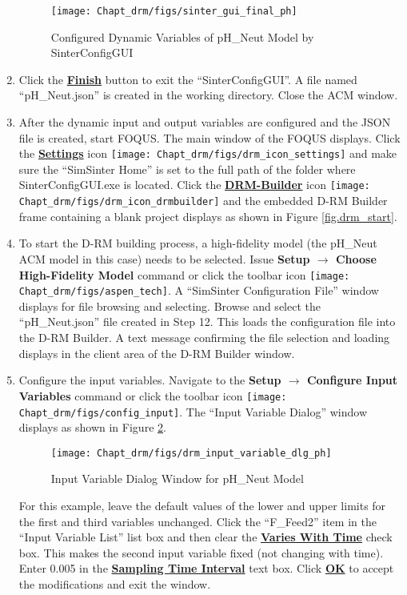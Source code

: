 \begin{enumerate}
\begin{figure}[H]
		\begin{center}
			\texttt{[image: Chapt\_drm/figs/sinter\_gui\_final\_ph]}
			\caption{Configured Dynamic Variables of pH\_Neut Model by SinterConfigGUI}
			\label{fig.sinter_gui_final_ph}
		\end{center}
	\end{figure}
	\item Click the \textbf{\underline{Finish}} button to exit the ``SinterConfigGUI''.  A file named ``pH\_Neut.json'' is created in the working directory.  Close the ACM window.
	\item After the dynamic input and output variables are configured and the JSON file is created, start FOQUS.  The main window of the FOQUS displays.  Click the \textbf{\underline{Settings}} icon \texttt{[image: Chapt\_drm/figs/drm\_icon\_settings]} and make sure the ``SimSinter Home'' is set to the full path of the folder where SinterConfigGUI.exe is located.  Click the \textbf{\underline{DRM-Builder}} icon \texttt{[image: Chapt\_drm/figs/drm\_icon\_drmbuilder]} and the embedded D-RM Builder frame containing a blank project displays as shown in Figure \ref{fig.drm_start}.  
	\item To start the D-RM building process, a high-fidelity model (the pH\_Neut ACM model in this case) needs to be selected.  Issue \textbf{Setup $\rightarrow$ Choose High-Fidelity Model} command or click the toolbar icon \texttt{[image: Chapt\_drm/figs/aspen\_tech]}.  A ``SimSinter Configuration File'' window displays for file browsing and selecting.  Browse and select the ``pH\_Neut.json'' file created in Step 12.  This loads the configuration file into the D-RM Builder.  A text message confirming the file selection and loading displays in the client area of the D-RM Builder window.
	\item Configure the input variables. Navigate to the \textbf{Setup $\rightarrow$ Configure Input Variables} command or click the toolbar icon \texttt{[image: Chapt\_drm/figs/config\_input]}.  The ``Input Variable Dialog'' window displays as shown in Figure \ref{fig.drm_input_variable_dlg_ph}.
	\begin{figure}[H]
		\begin{center}
			\texttt{[image: Chapt\_drm/figs/drm\_input\_variable\_dlg\_ph]}
			\caption{Input Variable Dialog Window for pH\_Neut Model}
			\label{fig.drm_input_variable_dlg_ph}
		\end{center}
	\end{figure}
	For this example, leave the default values of the lower and upper limits for the first and third variables unchanged.  Click the ``F\_Feed2'' item in the ``Input Variable List'' list box and then clear the \textbf{\underline{Varies With Time}} check box.  This makes the second input variable fixed (not changing with time).  Enter 0.005 in the \textbf{\underline{Sampling Time Interval}} text box.  Click \textbf{\underline{OK}} to accept the modifications and exit the window.

\end{enumerate}

